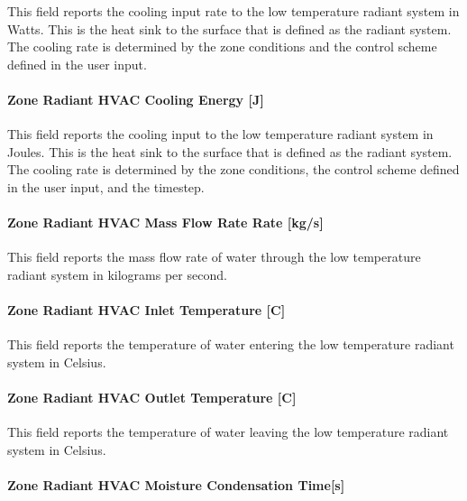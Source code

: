 This field reports the cooling input rate to the low temperature radiant system in Watts. This is the heat sink to the surface that is defined as the radiant system. The cooling rate is determined by the zone conditions and the control scheme defined in the user input.

\paragraph{Zone Radiant HVAC Cooling Energy {[}J{]}}\label{zone-radiant-hvac-cooling-energy-j}

This field reports the cooling input to the low temperature radiant system in Joules. This is the heat sink to the surface that is defined as the radiant system. The cooling rate is determined by the zone conditions, the control scheme defined in the user input, and the timestep.

\paragraph{Zone Radiant HVAC Mass Flow Rate Rate {[}kg/s{]}}\label{zone-radiant-hvac-mass-flow-rate-rate-kgs}

This field reports the mass flow rate of water through the low temperature radiant system in kilograms per second.

\paragraph{Zone Radiant HVAC Inlet Temperature {[}C{]}}\label{zone-radiant-hvac-inlet-temperature-c}

This field reports the temperature of water entering the low temperature radiant system in Celsius.

\paragraph{Zone Radiant HVAC Outlet Temperature {[}C{]}}\label{zone-radiant-hvac-outlet-temperature-c}

This field reports the temperature of water leaving the low temperature radiant system in Celsius.

\paragraph{Zone Radiant HVAC Moisture Condensation Time{[}s{]}}\label{zone-radiant-hvac-moisture-condensation-times}

